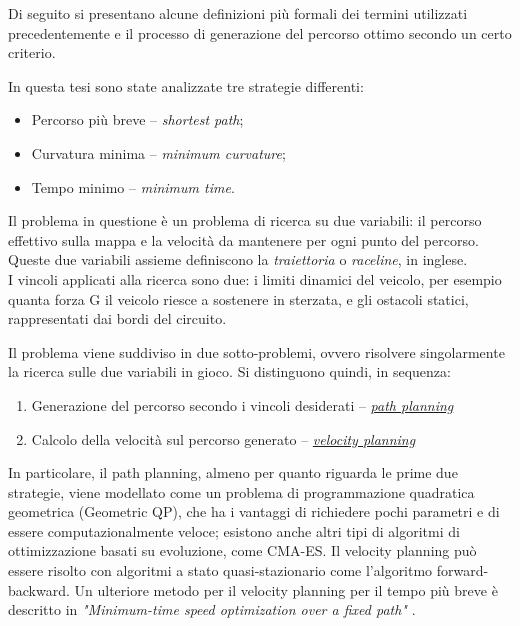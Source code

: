 Di seguito si presentano alcune definizioni più formali dei termini utilizzati precedentemente e il
processo di generazione del percorso ottimo secondo un certo criterio.

\bigskip
\noindent In questa tesi sono state analizzate tre strategie differenti:
\begin{itemize}
	\setlength\itemsep{0em}
	\item Percorso più breve  -- \textit{shortest path};
	\item Curvatura minima -- \textit{minimum curvature};
	\item Tempo minimo -- \textit{minimum time}.
\end{itemize}

\noindent Il problema in questione è un problema di ricerca su due variabili: il percorso effettivo sulla mappa e
la velocità da mantenere per ogni punto del percorso. Queste due variabili assieme definiscono la
\textit{traiettoria} o \textit{raceline}, in inglese.\\
I vincoli applicati alla ricerca sono due: i limiti dinamici del veicolo, per esempio quanta forza G il
veicolo riesce a sostenere in sterzata, e gli ostacoli statici, rappresentati dai bordi del circuito.

\bigskip
\noindent Il problema viene suddiviso in due sotto-problemi, ovvero risolvere singolarmente la ricerca sulle due
variabili in gioco. Si distinguono quindi, in sequenza:
\begin{enumerate}
	\setlength\itemsep{0em}
	\item Generazione del percorso secondo i vincoli desiderati -- \hyperref[sec:path-models]{\textit{path
		planning}}
	\item Calcolo della velocità sul percorso generato -- \hyperref[sec:velocity-plan]{\textit{velocity
		planning}}
\end{enumerate}
In particolare, il path planning, almeno per quanto riguarda le prime due strategie, viene modellato come
un problema di programmazione quadratica geometrica (Geometric QP), che ha i vantaggi di richiedere pochi
parametri e di essere computazionalmente veloce; esistono anche altri tipi di algoritmi di ottimizzazione
basati su evoluzione, come CMA-ES. Il velocity planning può essere risolto con algoritmi a stato
quasi-stazionario come l'algoritmo forward-backward. Un ulteriore metodo per il velocity planning per il
tempo più breve è descritto in \textit{"Minimum-time speed optimization over a fixed path"}
\cite{lipp2014minimum}.

